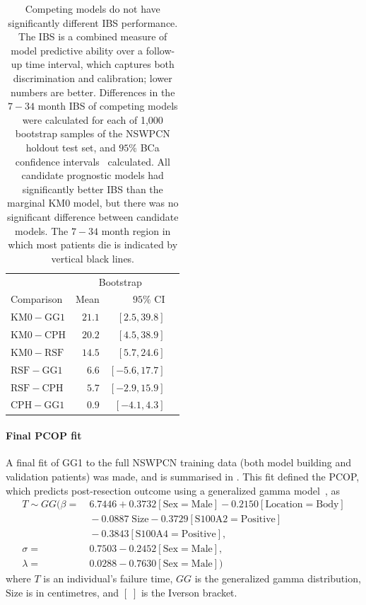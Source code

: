 \documentclass[dissertation.tex]{subfiles}
\begin{document}
\begin{table}
\centering
\caption[Prognostic model \texorpdfstring{\acrshort{IBS}}{IBS} comparison]{Competing models do not have significantly different \gls{IBS} performance.  The \gls{IBS} is a combined measure of model predictive ability over a follow-up time interval, which captures both discrimination and calibration; lower numbers are better.  Differences in the $7-34$ month \gls{IBS} of competing models were calculated for each of 1,000 bootstrap samples of the \gls{NSWPCN} holdout test set, and $95\%$ BCa confidence intervals~\cite{Efron1987} calculated.  All candidate prognostic models had significantly better \gls{IBS} than the marginal KM0 model, but there was no significant difference between candidate models.  The $7-34$ month region in which most patients die is indicated by vertical black lines.}
\label{tab:nomo-ibs-boot}
\begin{tabular}{lrrr}
\toprule
                             & \multicolumn{2}{c}{Bootstrap}   \\ \cmidrule(r){2-3}
Comparison                   & Mean          & $95\%$ CI       \\ \midrule
$\mathrm{KM0} - \mathrm{GG1}$    & $21.1$        & $[2.5, 39.8]$   \\
$\mathrm{KM0} - \mathrm{CPH}$    & $20.2$        & $[4.5, 38.9]$   \\
$\mathrm{KM0} - \mathrm{RSF}$    & $14.5$        & $[5.7, 24.6]$   \\
$\mathrm{RSF} - \mathrm{GG1}$    &  $6.6$        & $[-5.6, 17.7]$  \\
$\mathrm{RSF} - \mathrm{CPH}$    &  $5.7$        & $[-2.9, 15.9]$  \\ 
$\mathrm{CPH} - \mathrm{GG1}$    &  $0.9$        & $[-4.1, 4.3]$   \\ \bottomrule
\end{tabular}
\end{table}

\paragraph{Final \texorpdfstring{\acrshort{PCOP}}{PCOP} fit}
A final fit of GG1 to the full \gls{NSWPCN} training data (both model building and validation patients) was made, and is summarised in .  This fit defined the \gls{PCOP}, which predicts post-resection outcome using a generalized gamma model~\cite{Cox2007}, as
\begin{align*}
T \sim GG(\beta   = &\ 6.7446 + 0.3732[\mathrm{Sex = Male}] - 0.2150[\mathrm{Location = Body}] \\
                    &\ -0.0887\;\mathrm{Size} - 0.3729[\mathrm{S100A2 = Positive}] \\
                    &\ -0.3843[\mathrm{S100A4 = Positive}], \\ 
          \sigma  = &\ 0.7503 - 0.2452[\mathrm{Sex = Male}],\\
          \lambda = &\ 0.0288 - 0.7630[\mathrm{Sex = Male}])
\end{align*}
where $T$ is an individual's failure time, $GG$ is the generalized gamma distribution, $\mathrm{Size}$ is in centimetres, and $[\;]$ is the Iverson bracket.
\end{document}

